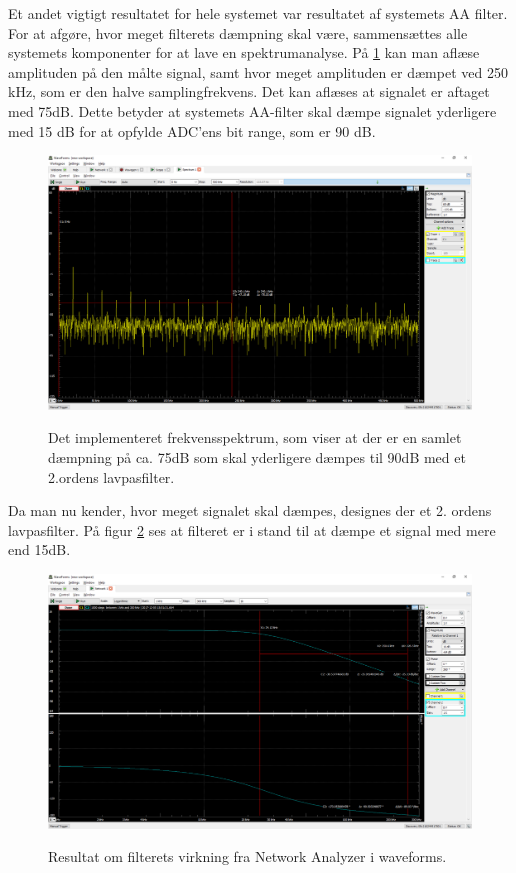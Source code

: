 \pagebreak 

Et andet vigtigt resultatet for hele systemet var resultatet af systemets AA filter. For at afgøre, hvor meget filterets dæmpning skal være, sammensættes alle systemets komponenter for at lave en spektrumanalyse. På \ref{fig:aaspectrum1} kan man aflæse amplituden på den målte signal, samt hvor meget amplituden er dæmpet ved 250 kHz, som er den halve samplingfrekvens. Det kan aflæses at signalet er aftaget med 75dB. Dette betyder at systemets AA-filter skal dæmpe signalet yderligere med 15 dB  for at opfylde ADC'ens bit range, som er 90 dB.   

       
\begin{figure}[H] 
\centering
{\includegraphics[width=\linewidth]
{Figure/aaspectrum1}}
\caption{Det implementeret frekvensspektrum, som viser at der er en samlet dæmpning på ca. 75dB som skal yderligere dæmpes til 90dB med et 2.ordens lavpasfilter.}
\label{fig:aaspectrum1}
\end{figure}

\pagebreak

Da man nu kender, hvor meget signalet skal dæmpes, designes der et 2. ordens lavpasfilter. På figur \ref{fig:aafiltermodultest} ses at filteret er i stand til at dæmpe et signal med mere end 15dB. 


\begin{figure}[H] 
\centering
{\includegraphics[width=\linewidth]
{Figure/aafiltermodultest}}
\caption{Resultat om filterets virkning fra Network Analyzer i waveforms.}
\label{fig:aafiltermodultest}
\end{figure}



